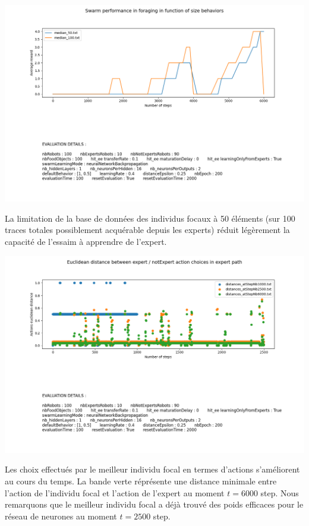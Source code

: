 \documentclass[a4paper, 12pt]{report}
\begin{document}
    \includegraphics[scale=0.5]{sizeDB_50vs100_bp.png}

    La limitation de la base de données des individus focaux à 50 éléments (sur 100 traces totales possiblement acquérable depuis les experts) réduit légèrement la capacité de l'essaim à apprendre de l'expert. 


    \includegraphics[scale=0.5]{distances_bp.png}

    Les choix effectués par le meilleur individu focal en termes d'actions s'améliorent au cours du temps. La bande verte réprésente une distance minimale entre l'action de l'individu focal et l'action de l'expert au moment $t = 6000$ step.
    Nous remarquons que le meilleur individu focal a déjà trouvé des poids efficaces pour le réseau de neurones au moment $t = 2500$ step. 
\end{document}

